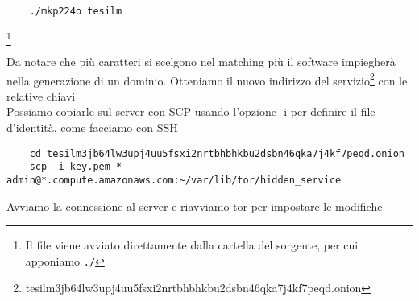\begin{lstlisting}
    ./mkp224o tesilm
\end{lstlisting}
\footnote{Il file viene avviato direttamente dalla cartella del sorgente, per cui apponiamo \lstinline{./}}

Da notare che più caratteri si scelgono nel matching più il software impiegherà nella generazione di un dominio. 
Otteniamo il nuovo indirizzo del servizio\footnote{tesilm3jb64lw3upj4uu5fsxi2nrtbhbhkbu2dsbn46qka7j4kf7peqd.onion} con le relative chiavi \\
Possiamo copiarle sul server con SCP usando l'opzione -i per definire il file d'identità, come facciamo con SSH

\begin{lstlisting}
    cd tesilm3jb64lw3upj4uu5fsxi2nrtbhbhkbu2dsbn46qka7j4kf7peqd.onion
    scp -i key.pem * admin@*.compute.amazonaws.com:~/var/lib/tor/hidden_service
\end{lstlisting}

Avviamo la connessione al server e riavviamo tor per impostare le modifiche



\newpage

